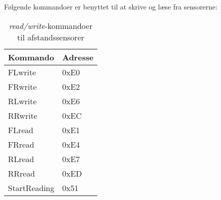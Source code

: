 Følgende kommandoer er benyttet til at skrive og læse fra sensorerne: 

\begin{table}[h]\centering
	\begin{tabular}{| l | l |} \hline
		\textbf{Kommando} & \textbf{Adresse}	\\\hline
		FLwrite 		  & 0xE0				\\\hline
		FRwrite 		  & 0xE2				\\\hline
		RLwrite 		  & 0xE6				\\\hline
		RRwrite 		  & 0xEC				\\\hline
		FLread  		  & 0xE1				\\\hline
		FRread  		  & 0xE4				\\\hline
		RLread  		  & 0xE7				\\\hline
		RRread  		  & 0xED				\\\hline
		StartReading	  & 0x51				\\\hline
	\end{tabular}
	\caption{\textit{read/write}-kommandoer til afstandssensorer}
	\label{table:adr_afstandssensorer_kommadoer}
\end{table}